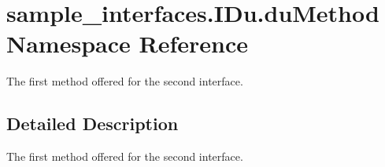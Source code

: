 \hypertarget{namespacesample__interfaces_1_1_i_du_1_1du_method}{\section{sample\-\_\-interfaces.\-I\-Du.\-du\-Method Namespace Reference}
\label{namespacesample__interfaces_1_1_i_du_1_1du_method}
}


The first method offered for the second interface.  




\subsection{Detailed Description}
The first method offered for the second interface. 